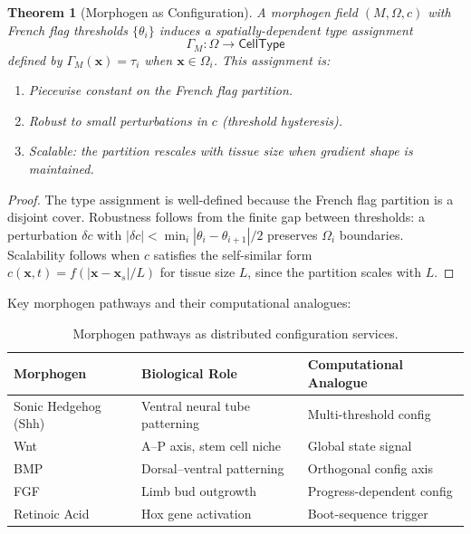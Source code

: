 \documentclass[12pt,a4paper]{article}
\newtheorem{theorem}{Theorem}[section]
\begin{document}
\begin{theorem}[Morphogen as Configuration]\label{thm:morphogen-config}
A morphogen field $(M, \Omega, c)$ with French flag thresholds
$\{\theta_i\}$ induces a \emph{spatially-dependent type assignment}
\[
  \Gamma_M : \Omega \to \mathsf{CellType}
\]
defined by $\Gamma_M(\mathbf{x}) = \tau_i$ when $\mathbf{x} \in
\Omega_i$.  This assignment is:
\begin{enumerate}
  \item \emph{Piecewise constant} on the French flag partition.
  \item \emph{Robust} to small perturbations in $c$ (threshold
    hysteresis).
  \item \emph{Scalable}: the partition rescales with tissue size
    when gradient shape is maintained.
\end{enumerate}
\end{theorem}

\begin{proof}
The type assignment is well-defined because the French flag partition
is a disjoint cover.  Robustness follows from the finite gap between
thresholds: a perturbation $\delta c$ with
$|\delta c| < \min_i |\theta_i - \theta_{i+1}|/2$ preserves
$\Omega_i$ boundaries.  Scalability follows when $c$ satisfies the
self-similar form $c(\mathbf{x},t) = f(|\mathbf{x} - \mathbf{x}_s|/L)$
for tissue size $L$, since the partition scales with $L$.
\end{proof}

Key morphogen pathways and their computational analogues:

\begin{table}[H]
\centering
\begin{tabular}{lll}
\toprule
\textbf{Morphogen} & \textbf{Biological Role} & \textbf{Computational Analogue} \\
\midrule
Sonic Hedgehog (Shh) & Ventral neural tube patterning & Multi-threshold config \\
Wnt & A--P axis, stem cell niche & Global state signal \\
BMP & Dorsal--ventral patterning & Orthogonal config axis \\
FGF & Limb bud outgrowth & Progress-dependent config \\
Retinoic Acid & Hox gene activation & Boot-sequence trigger \\
\bottomrule
\end{tabular}
\caption{Morphogen pathways as distributed configuration services.}
\label{tab:morphogens}
\end{table}
\end{document}
